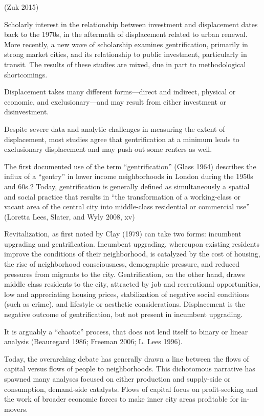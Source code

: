 \documentclass[]{article}
\begin{document}
(Zuk 2015)

Scholarly interest in the relationship between investment and
displacement dates back to the 1970s, in the aftermath of displacement
related to urban renewal. More recently, a new wave of scholarship
examines gentrification, primarily in strong market cities, and its
relationship to public investment, particularly in transit. The results
of these studies are mixed, due in part to methodological shortcomings.

Displacement takes many different forms---direct and indirect, physical
or economic, and exclusionary---and may result from either investment or
disinvestment.

Despite severe data and analytic challenges in measuring the extent of
displacement, most studies agree that gentrification at a minimum leads
to exclusionary displacement and may push out some renters as well.

The first documented use of the term ``gentrification'' (Glass 1964)
describes the influx of a ``gentry'' in lower income neighborhoods in
London during the 1950s and 60s.2 Today, gentrification is generally
defined as simultaneously a spatial and social practice that results in
``the transformation of a working-class or vacant area of the central
city into middle-class residential or commercial use'' (Loretta Lees,
Slater, and Wyly 2008, xv)

Revitalization, as first noted by Clay (1979) can take two forms:
incumbent upgrading and gentrification. Incumbent upgrading, whereupon
existing residents improve the conditions of their neighborhood, is
catalyzed by the cost of housing, the rise of neighborhood
consciousness, demographic pressure, and reduced pressures from migrants
to the city. Gentrification, on the other hand, draws middle class
residents to the city, attracted by job and recreational opportunities,
low and appreciating housing prices, stabilization of negative social
conditions (such as crime), and lifestyle or aesthetic considerations.
Displacement is the negative outcome of gentrification, but not present
in incumbent upgrading.

It is arguably a ``chaotic'' process, that does not lend itself to
binary or linear analysis (Beauregard 1986; Freeman 2006; L. Lees 1996).

Today, the overarching debate has generally drawn a line between the
flows of capital versus flows of people to neighborhoods. This
dichotomous narrative has spawned many analyses focused on either
production and supply-side or consumption, demand-side catalysts. Flows
of capital focus on profit-seeking and the work of broader economic
forces to make inner city areas profitable for in-movers.
\end{document}

